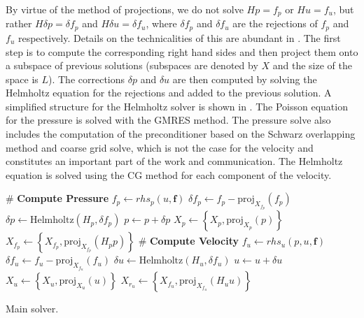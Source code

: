 \documentclass{sig-alternate}
\begin{document}
By virtue of the method of projections, we do not solve $Hp=f_p$ or $Hu=f_u$, but 
rather $H\delta p=\delta f_p$ and $H\delta u=\delta f_u$, where $\delta f_p$ and 
$\delta f_u$ are the rejections of $f_p$ and $f_u$ respectively. Details on the 
technicalities of this are abundant in \cite{Fischer1998}. The first step is to 
compute the corresponding right hand sides and then project them onto a subspace 
of previous solutions (subspaces are denoted by $X$ and the size of the space is $L$).
 The corrections $\delta p$ and $\delta u$ are then computed by solving the Helmholtz 
equation for the rejections and added to the previous solution. A simplified structure 
for the Helmholtz solver is shown in . The Poisson equation for
the pressure is solved with the GMRES method. The pressure solve also includes the
computation of the preconditioner based on the Schwarz overlapping method and 
coarse grid solve, which is not the case for the velocity and constitutes an 
important part of the work and communication. The Helmholtz equation is solved using the CG method for each component of the velocity.

\begin{algorithm}
\begin{algorithmic}
\State \# \textbf{Compute Pressure}
\State $f_p \leftarrow rhs_p(u, \mathbf{f})$ %
\State $\delta f_p \leftarrow f_p - \text{proj}_{X_{f_p}}(f_p)$ %
\State $\delta p \leftarrow \text{Helmholtz}(H_p,\delta f_p)$ %
\State $p \leftarrow p + \delta p$ %
\State $X_p \leftarrow \left\{ X_p, \text{proj}_{X_{p}}(p) \right\}$ %
\State $X_{f_p} \leftarrow \left\{ X_{f_p}, \text{proj}_{X_{f_p}}(H_p p) \right\}$ %
\State \# \textbf{Compute Velocity}
\State $f_{u} \leftarrow rhs_{u}(p, u, \mathbf{f})$ %
\State $\delta f_{u} \leftarrow f_{u} - \text{proj}_{X_{f_{u}}}(f_{u})$ %
\State $\delta {u} \leftarrow \text{Helmholtz}(H_{u},\delta f_{u})$ %
\State ${u} \leftarrow u + \delta u$ %
\State $X_{u} \leftarrow \left\{ X_{u}, \text{proj}_{X_{u}}(u) \right\}$ %
\State $X_{r_{u}} \leftarrow \left\{ X_{f_{u}}, \text{proj}_{X_{f_u}}(H_{u} u) \right\}$ %
\EndFor
\EndProcedure
\end{algorithmic}
\caption{Main solver.}
\label{alg:code_struct}
\end{algorithm}
\end{document}
